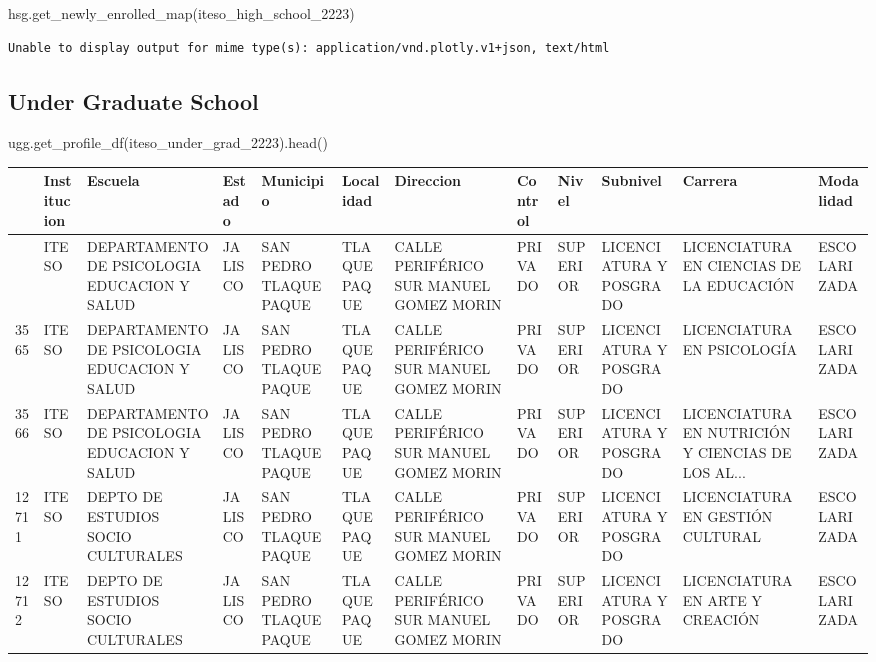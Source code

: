 \documentclass[
  letterpaper,
  DIV=11,
  numbers=noendperiod]{scrartcl}
\newenvironment{Shaded}{\begin{snugshade}}{\end{snugshade}}
\newcommand{\NormalTok}[1]{\textcolor[rgb]{0.00,0.23,0.31}{#1}}
\begin{document}
\begin{Shaded}
\begin{Highlighting}[]
\NormalTok{hsg.get\_newly\_enrolled\_map(iteso\_high\_school\_2223)}
\end{Highlighting}
\end{Shaded}

\begin{verbatim}
Unable to display output for mime type(s): application/vnd.plotly.v1+json, text/html
\end{verbatim}

\subsection{Under Graduate School}\label{under-graduate-school}

\begin{Shaded}
\begin{Highlighting}[]
\NormalTok{ugg.get\_profile\_df(iteso\_under\_grad\_2223).head()}
\end{Highlighting}
\end{Shaded}

\begin{longtable}[]{@{}llllllllllll@{}}
\toprule\noalign{}
& Institucion & Escuela & Estado & Municipio & Localidad & Direccion &
Control & Nivel & Subnivel & Carrera & Modalidad \\
\midrule\noalign{}
\endhead
\bottomrule\noalign{}
\endlastfoot
3564 & ITESO & DEPARTAMENTO DE PSICOLOGIA EDUCACION Y SALUD & JALISCO &
SAN PEDRO TLAQUEPAQUE & TLAQUEPAQUE & CALLE PERIFÉRICO SUR MANUEL GOMEZ
MORIN & PRIVADO & SUPERIOR & LICENCIATURA Y POSGRADO & LICENCIATURA EN
CIENCIAS DE LA EDUCACIÓN & ESCOLARIZADA \\
3565 & ITESO & DEPARTAMENTO DE PSICOLOGIA EDUCACION Y SALUD & JALISCO &
SAN PEDRO TLAQUEPAQUE & TLAQUEPAQUE & CALLE PERIFÉRICO SUR MANUEL GOMEZ
MORIN & PRIVADO & SUPERIOR & LICENCIATURA Y POSGRADO & LICENCIATURA EN
PSICOLOGÍA & ESCOLARIZADA \\
3566 & ITESO & DEPARTAMENTO DE PSICOLOGIA EDUCACION Y SALUD & JALISCO &
SAN PEDRO TLAQUEPAQUE & TLAQUEPAQUE & CALLE PERIFÉRICO SUR MANUEL GOMEZ
MORIN & PRIVADO & SUPERIOR & LICENCIATURA Y POSGRADO & LICENCIATURA EN
NUTRICIÓN Y CIENCIAS DE LOS AL... & ESCOLARIZADA \\
12711 & ITESO & DEPTO DE ESTUDIOS SOCIO CULTURALES & JALISCO & SAN PEDRO
TLAQUEPAQUE & TLAQUEPAQUE & CALLE PERIFÉRICO SUR MANUEL GOMEZ MORIN &
PRIVADO & SUPERIOR & LICENCIATURA Y POSGRADO & LICENCIATURA EN GESTIÓN
CULTURAL & ESCOLARIZADA \\
12712 & ITESO & DEPTO DE ESTUDIOS SOCIO CULTURALES & JALISCO & SAN PEDRO
TLAQUEPAQUE & TLAQUEPAQUE & CALLE PERIFÉRICO SUR MANUEL GOMEZ MORIN &
PRIVADO & SUPERIOR & LICENCIATURA Y POSGRADO & LICENCIATURA EN ARTE Y
CREACIÓN & ESCOLARIZADA \\
\end{longtable}
\end{document}
